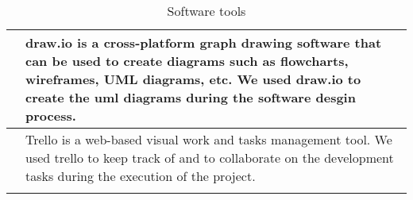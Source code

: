 \begin{longtable}{ | m{} | m{} | }
      \centering    & draw.io is a cross-platform graph drawing software that can be used to create diagrams such as flowcharts, wireframes, UML diagrams, etc. We used draw.io to create the uml diagrams during the software desgin process.                                                                                                       \\
      \hline
      \centering    & Trello is a web-based visual work and tasks management tool. We used trello to keep track of and to collaborate on the development tasks during the execution of the project.                                                                                                                                                  \\
      \hline
      \caption{Software tools}
      \label{tools}
\end{longtable}